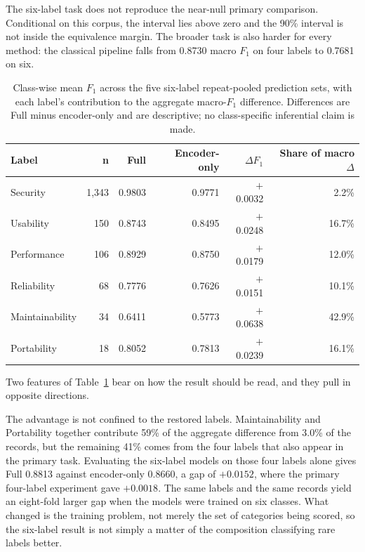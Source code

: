 \documentclass[11pt,a4paper]{article}
\begin{document}
The six-label task does not reproduce the near-null primary comparison. Conditional on this corpus, the
interval lies above zero and the 90\% interval is not inside the equivalence margin. The broader task is
also harder for every method: the classical pipeline falls from 0.8730 macro $F_1$ on four labels to
0.7681 on six.

\begin{table}[htbp]
\centering
\caption{Class-wise mean $F_1$ across the five six-label repeat-pooled prediction sets, with each label's
contribution to the aggregate macro-$F_1$ difference. Differences are Full minus encoder-only and are
descriptive; no class-specific inferential claim is made.}
\label{tab:sixclasswise}
\small
\begin{tabular}{@{}lrrrrr@{}}
\toprule
\textbf{Label} & \textbf{n} & \textbf{Full} & \textbf{Encoder-only} & \textbf{$\Delta F_1$} & \textbf{Share of macro $\Delta$}\\
\midrule
Security & 1{,}343 & 0.9803 & 0.9771 & $+$0.0032 & 2.2\%\\
Usability & 150 & 0.8743 & 0.8495 & $+$0.0248 & 16.7\%\\
Performance & 106 & 0.8929 & 0.8750 & $+$0.0179 & 12.0\%\\
Reliability & 68 & 0.7776 & 0.7626 & $+$0.0151 & 10.1\%\\
Maintainability & 34 & 0.6411 & 0.5773 & $+$0.0638 & 42.9\%\\
Portability & 18 & 0.8052 & 0.7813 & $+$0.0239 & 16.1\%\\
\bottomrule
\end{tabular}
\end{table}

Two features of Table~\ref{tab:sixclasswise} bear on how the result should be read, and they pull in
opposite directions.

The advantage is not confined to the restored labels. Maintainability and Portability together contribute
59\% of the aggregate difference from 3.0\% of the records, but the remaining 41\% comes from the four
labels that also appear in the primary task. Evaluating the six-label models on those four labels alone
gives Full 0.8813 against encoder-only 0.8660, a gap of $+0.0152$, where the primary four-label experiment
gave $+0.0018$. The same labels and the same records yield an eight-fold larger gap when the models were
trained on six classes. What changed is the training problem, not merely the set of categories being
scored, so the six-label result is not simply a matter of the composition classifying rare labels better.
\end{document}
